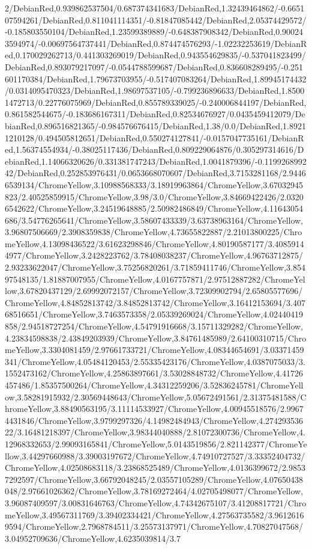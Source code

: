 {\begin{tikzternal}
2/DebianRed,0.939862537504/0.687374341683/DebianRed,1.32439464862/-0.665107594261/DebianRed,0.811041114351/-0.81847085442/DebianRed,2.05374429572/-0.185803550104/DebianRed,1.23599389889/-0.648387908342/DebianRed,0.900243594974/-0.00697564737441/DebianRed,0.874474576293/-1.02232253619/DebianRed,0.170029262713/0.441303269019/DebianRed,0.943554629835/-0.537041823499/DebianRed,0.893079217097/-0.0544788599687/DebianRed,0.836608289495/-0.251601170384/DebianRed,1.79673703955/-0.517407083264/DebianRed,1.89945174432/0.0314095470323/DebianRed,1.98697537105/-0.799236896633/DebianRed,1.85001472713/0.22776075969/DebianRed,0.855789339025/-0.240006844197/DebianRed,0.861582544675/-0.183686167311/DebianRed,0.82534676927/0.0435459412079/DebianRed,0.896516821365/-0.984576676415/DebianRed,1.38/0.0/DebianRed,1.89211210128/0.494505812651/DebianRed,0.550274127841/-0.0157047735161/DebianRed,1.56374554934/-0.38025117436/DebianRed,0.809229064876/0.305297314616/DebianRed,1.14066320626/0.331381747243/DebianRed,1.0041879396/-0.119926899242/DebianRed,0.252853976431/0.0653668070607/DebianRed,3.7153281168/2.94466539134/ChromeYellow,3.10988568333/3.18919963864/ChromeYellow,3.67032945823/2.40525859915/ChromeYellow,3.98/3.0/ChromeYellow,3.84669422426/2.03206542622/ChromeYellow,3.24519648885/2.50982486849/ChromeYellow,4.11643054686/3.54776265641/ChromeYellow,3.58607433339/3.63738963164/ChromeYellow,3.96807506669/2.3908359838/ChromeYellow,4.73655822887/2.21013800225/ChromeYellow,4.13098436522/3.61623298846/ChromeYellow,4.80190587177/3.40859144977/ChromeYellow,3.2428223762/3.78408038237/ChromeYellow,4.96763712875/2.93233622047/ChromeYellow,3.75256820261/3.71859411746/ChromeYellow,3.85497548135/1.81887007955/ChromeYellow,4.0167757871/2.97512887282/ChromeYellow,3.67820437129/2.69992072157/ChromeYellow,3.72309902794/2.65805577696/ChromeYellow,4.84852813742/3.84852813742/ChromeYellow,3.16412153694/3.40768516651/ChromeYellow,3.7463573358/2.05339269024/ChromeYellow,4.02440419858/2.94518727254/ChromeYellow,4.54791916668/3.15711329282/ChromeYellow,4.23834598838/2.43849203939/ChromeYellow,3.84761485989/2.64100310715/ChromeYellow,3.3304081459/2.97661733721/ChromeYellow,4.08344654691/3.03371459341/ChromeYellow,4.05484120453/2.55335423176/ChromeYellow,4.0387075033/3.1552473162/ChromeYellow,4.25863897661/3.53028848732/ChromeYellow,4.41726457486/1.85357500264/ChromeYellow,4.34312259206/3.52836245781/ChromeYellow,3.58281915932/2.30569448643/ChromeYellow,5.05672491561/2.31375481588/ChromeYellow,3.88490563195/3.11114533927/ChromeYellow,4.00945518576/2.99674431846/ChromeYellow,3.9799297326/4.14982484943/ChromeYellow,4.27429353622/3.16481218397/ChromeYellow,3.98344040888/2.81072300736/ChromeYellow,4.12968332653/2.99093165841/ChromeYellow,5.0143519856/2.821142377/ChromeYellow,3.44297660988/3.39003197672/ChromeYellow,4.74910727527/3.33352404732/ChromeYellow,4.02508683118/3.23868525489/ChromeYellow,4.0136399672/2.98537292597/ChromeYellow,3.66792048245/2.03557105289/ChromeYellow,4.07650438048/2.97661026362/ChromeYellow,3.78169272464/4.02705498077/ChromeYellow,3.96087409597/3.00831646763/ChromeYellow,4.74342675107/3.41208817721/ChromeYellow,3.49567311769/3.39402334421/ChromeYellow,4.27563735582/3.96126169594/ChromeYellow,2.7968784511/3.25573137971/ChromeYellow,4.70827047568/3.04952709636/ChromeYellow,4.6235039814/3.7
\end{tikzternal}}
